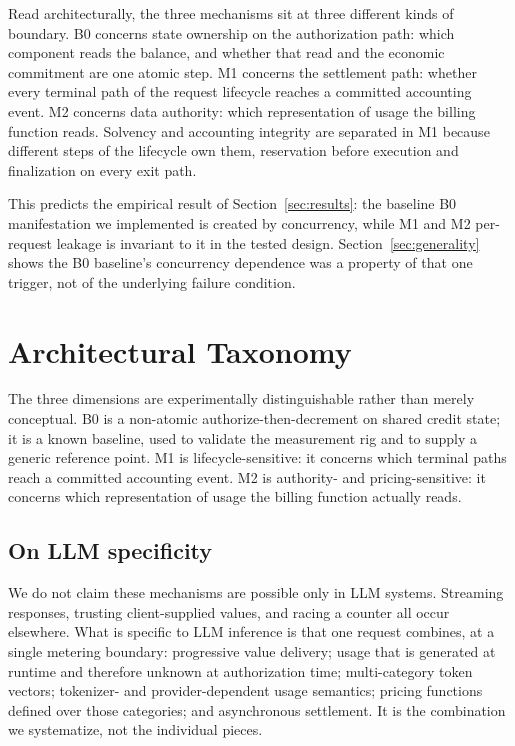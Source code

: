 \documentclass[preprint,3p,authoryear,12pt]{elsarticle}
\begin{document}
Read architecturally, the three mechanisms sit at three different kinds of boundary. B0
concerns state ownership on the authorization path: which component reads the balance,
and whether that read and the economic commitment are one atomic step. M1 concerns the
settlement path: whether every terminal path of the request lifecycle reaches a committed
accounting event. M2 concerns data authority: which representation of usage the billing
function reads. Solvency and accounting integrity are separated in M1 because different
steps of the lifecycle own them, reservation before execution and finalization on every
exit path.

This predicts the empirical result of Section~\ref{sec:results}: the baseline B0
manifestation we implemented is created by concurrency, while M1 and M2 per-request
leakage is invariant to it in the tested design. Section~\ref{sec:generality}
shows the B0 baseline's concurrency dependence was a property of that one trigger, not
of the underlying failure condition.

\section{Architectural Taxonomy}
\label{sec:taxonomy}
The three dimensions are experimentally distinguishable rather than merely conceptual. B0
is a non-atomic authorize-then-decrement on shared credit state; it is a known baseline,
used to validate the measurement rig and to supply a generic reference point. M1 is
lifecycle-sensitive: it concerns which terminal paths reach a committed accounting event.
M2 is authority- and pricing-sensitive: it concerns which representation of usage the
billing function actually reads.

\subsection{On LLM specificity}
We do not claim these mechanisms are possible only in LLM systems. Streaming responses,
trusting client-supplied values, and racing a counter all occur elsewhere. What is
specific to LLM inference is that one request combines, at a single metering boundary:
progressive value delivery; usage that is generated at runtime and therefore unknown at
authorization time; multi-category token vectors; tokenizer- and provider-dependent usage
semantics; pricing functions defined over those categories; and asynchronous settlement.
It is the combination we systematize, not the individual pieces.
\end{document}

